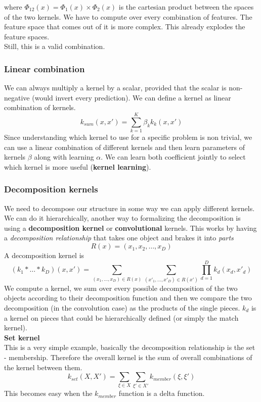 where $\Phi_{12}(x) = \Phi_{1}(x) \times \Phi_{2}(x)$ is the cartesian product
between the spaces of the two kernels. We have to compute over every combination
of features. The feature space that comes out of it is more complex. This already
explodes the feature spaces. \\ Still, this is a valid combination.

\subsubsection{Linear combination}
We can always multiply a kernel by a scalar, provided that the scalar is non-negative
(would invert every prediction). We can define a kernel as linear combination of
kernels.
\[
	k_{sum}(x, x') = \sum_{k=1}^{K}\beta_{k}k_{k}(x,x')
\]
Since understanding which kernel to use for a specific problem is non trivial, we
can use a linear combination of different kernels and then learn parameters of kernels
$\beta$ along with learning $\alpha$. We can learn both coefficient jointly to
select which kernel is more useful (\textbf{kernel learning}).

\subsubsection{Decomposition kernels}
We need to decompose our structure in some way we can apply different kernels.
We can do it hierarchically, another way to formalizing the decomposition is using
a \textbf{decomposition kernel} or \textbf{convolutional} kernels. This works by
having a \textit{decomposition relationship} that takes one object and brakes it
into \textit{parts}
\[
	R(x)= (x_{1}, x_{2}, \dots, x_{D})
\]
A decomposition kernel is
\[
	(k_{1}* \dots * k_{D})(x, x') = \sum_{(x_1, \dots, x_D) \in R(x)}\sum_{(x'_1,
	\dots, x'_D) \in R(x')}\prod_{d=1}^{D}k_{d}(x_{d}, x'_{d})
\]
We compute a kernel, we sum over every possible decomposition of the two objects
according to their decomposition function and then we compare the two decomposition
(in the convolution case) as the products of the single pieces. $k_{d}$ is a
kernel on pieces that could be hierarchically defined (or simply the match kernel).\\

\textbf{Set kernel}\\ This is a very simple example, basically the decomposition
relationship is the set - membership. Therefore the overall kernel is the sum of
overall combinations of the kernel between them.
\[
	k_{set}(X, X') = \sum_{\xi \in X}\sum_{\xi' \in X'}k_{member}(\xi, \xi')
\]
This becomes easy when the $k_{member}$ function is a delta function.

